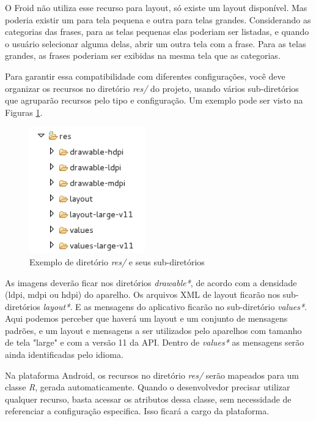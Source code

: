 O Froid não utiliza esse recurso para layout, só existe um layout disponível. Mas
poderia existir um para tela pequena e outra para telas grandes. Considerando as 
categorias das frases, para as telas pequenas elas poderiam ser listadas, e quando
o usuário selecionar alguma delas, abrir um outra tela com a frase. Para as telas
grandes, as frases poderiam ser exibidas na mesma tela que as categorias.

Para garantir essa compatibilidade com diferentes configurações, você deve organizar
os recursos no diretório {\it res/} do projeto, usando vários sub-diretórios que 
agruparão recursos pelo tipo e configuração. Um exemplo pode ser visto na Figuras
\ref{dir_res}.

\begin{figure}[h]
    \centering
    \includegraphics[width=5cm]{img/diretorio_resources}
    \caption{Exemplo de diretório {\it res/} e seus sub-diretórios}
    \label{dir_res}
\end{figure}

As imagens deverão ficar nos diretórios {\it drawable*}, de acordo com a densidade 
(ldpi, mdpi ou hdpi) do aparelho. Os arquivos XML de layout ficarão nos 
sub-diretórios {\it layout*}. E as mensagens do aplicativo ficarão no 
sub-diretório {\it values*}. Aqui podemos perceber que haverá um layout e um 
conjunto de mensagens padrões, e um layout e mensagens a ser utilizados pelo aparelhos com tamanho de tela "large" e com a versão 11 da API. Dentro de {\it values*} as 
mensagens serão ainda identificadas pelo idioma. 

Na plataforma Android, os recursos no diretório {\it res/} 
serão mapeados para um classe {\it R}, gerada automaticamente. Quando o desenvolvedor
precisar utilizar qualquer recurso, basta acessar os atributos dessa classe, sem 
necessidade de referenciar a configuração especifica. Isso ficará a cargo da plataforma.

